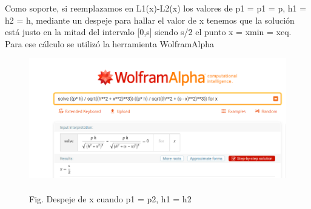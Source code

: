 \documentclass[11pt]{article}
\begin{document}
\begin{enumerate}
    Como soporte, si reemplazamos en L1(x)-L2(x) los valores de p1 = p1 = p, h1 = h2 = h, mediante un despeje para hallar el valor de x tenemos que la solución está justo en la mitad del intervalo [0,s] siendo s/2 el punto x = xmin = xeq. Para ese cálculo se utilizó la herramienta WolframAlpha
    \begin{figure}[!h]
        	\includegraphics[keepaspectratio, width=15cm]{Imagenes/soporte.png}
        	\caption{\\Fig. Despeje de x cuando p1 = p2, h1 = h2 \label{fig:grafica3}}
    \end{figure}


\end{enumerate}
\end{document}
